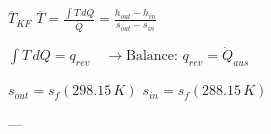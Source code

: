 \( \overline{T}_{KF} \)  
\( \overline{T} = \frac{\int T \, dQ}{\dot{Q}} = \frac{h_{out} - h_{in}}{s_{out} - s_{in}} \)  

\( \int T \, dQ = q_{rev} \quad \rightarrow \text{Balance: } q_{rev} = \dot{Q}_{aus} \)  

\( s_{out} = s_f (298.15 \, K) \)  
\( s_{in} = s_f (288.15 \, K) \)  

---